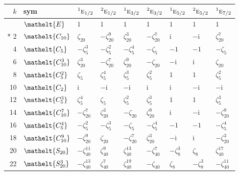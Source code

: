 \documentclass[10pt,a4paper]{article}
\numberwithin{equation}{section}
\newcommand{\eltfont}[1]{{\let\sigma\eltsigma\mathelt{#1}}}
\newcommand{\irr}[1]{\text{\normalfont\scshape #1}}
\newcommand{\conjpair}[1]{{}^{#1}}
\newcommand{\cls}[1]{\eltfont{#1}}
\newcommand{\iunit}{\mathrm{i}}
\newcommand{\rootunity}[1]{\zeta_{#1}}
\begin{document}
{\small\setlength{\tabcolsep}{4pt}
\begin{longtable}{@{}rllllllll@{}}\toprule
$k$ & sym & $\conjpair{1}\irr{e}_{1/2}$ & $\conjpair{2}\irr{e}_{1/2}$ & $\conjpair{1}\irr{e}_{3/2}$ & $\conjpair{2}\irr{e}_{3/2}$ & $\conjpair{1}\irr{e}_{5/2}$ & $\conjpair{2}\irr{e}_{5/2}$ & $\conjpair{1}\irr{e}_{7/2}$\\\midrule\endhead
\bottomrule\endfoot\endlastfoot
0 & $\cls{E}$ & $1$ & $1$ & $1$ & $1$ & $1$ & $1$ & $1$\\*
2 & $\cls{C_{10}}$ & $\rootunity{20}$ & $-\rootunity{20}^{9}$ & $\rootunity{20}^{3}$ & $-\rootunity{20}^{7}$ & $\iunit{}$ & $-\iunit{}$ & $\rootunity{20}^{7}$\\
4 & $\cls{C_{5}}$ & $-\rootunity{5}^{3}$ & $-\rootunity{5}^{2}$ & $-\rootunity{5}^{4}$ & $-\rootunity{5}$ & $-1$ & $-1$ & $-\rootunity{5}$\\
6 & $\cls{C_{10}^{3}}$ & $\rootunity{20}^{3}$ & $-\rootunity{20}^{7}$ & $\rootunity{20}^{9}$ & $-\rootunity{20}$ & $-\iunit{}$ & $\iunit{}$ & $\rootunity{20}$\\
8 & $\cls{C_{5}^{2}}$ & $\rootunity{5}$ & $\rootunity{5}^{4}$ & $\rootunity{5}^{3}$ & $\rootunity{5}^{2}$ & $1$ & $1$ & $\rootunity{5}^{2}$\\
10 & $\cls{C_{2}}$ & $\iunit{}$ & $-\iunit{}$ & $-\iunit{}$ & $\iunit{}$ & $\iunit{}$ & $-\iunit{}$ & $-\iunit{}$\\
12 & $\cls{C_{5}^{3}}$ & $\rootunity{5}^{4}$ & $\rootunity{5}$ & $\rootunity{5}^{2}$ & $\rootunity{5}^{3}$ & $1$ & $1$ & $\rootunity{5}^{3}$\\
14 & $\cls{C_{10}^{7}}$ & $-\rootunity{20}^{7}$ & $\rootunity{20}^{3}$ & $-\rootunity{20}$ & $\rootunity{20}^{9}$ & $\iunit{}$ & $-\iunit{}$ & $-\rootunity{20}^{9}$\\
16 & $\cls{C_{5}^{4}}$ & $-\rootunity{5}^{2}$ & $-\rootunity{5}^{3}$ & $-\rootunity{5}$ & $-\rootunity{5}^{4}$ & $-1$ & $-1$ & $-\rootunity{5}^{4}$\\
18 & $\cls{C_{10}^{9}}$ & $-\rootunity{20}^{9}$ & $\rootunity{20}$ & $-\rootunity{20}^{7}$ & $\rootunity{20}^{3}$ & $-\iunit{}$ & $\iunit{}$ & $-\rootunity{20}^{3}$\\
20 & $\cls{S_{20}}$ & $-\rootunity{40}^{11}$ & $\rootunity{40}^{9}$ & $\rootunity{40}^{13}$ & $-\rootunity{40}^{7}$ & $-\rootunity{8}^{3}$ & $\rootunity{8}$ & $\rootunity{40}^{17}$\\
22 & $\cls{S_{20}^{3}}$ & $-\rootunity{40}^{13}$ & $\rootunity{40}^{7}$ & $\rootunity{40}^{19}$ & $-\rootunity{40}$ & $\rootunity{8}$ & $-\rootunity{8}^{3}$ & $-\rootunity{40}^{11}$\\

\end{longtable}}
\end{document}
